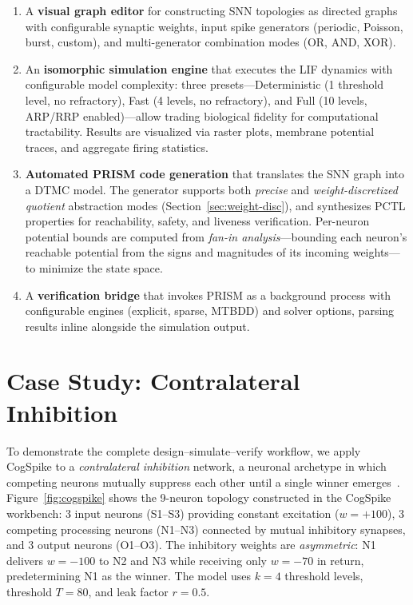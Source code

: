 \documentclass[runningheads]{llncs}
\begin{document}
\begin{enumerate}
\item A \textbf{visual graph editor} for constructing SNN topologies as directed
  graphs with configurable synaptic weights, input spike generators (periodic,
  Poisson, burst, custom), and multi-generator combination modes (OR, AND, XOR).

\item An \textbf{isomorphic simulation engine} that executes the LIF dynamics
  with configurable model complexity: three presets---Deterministic (1 threshold
  level, no refractory), Fast (4 levels, no refractory), and Full (10 levels,
  ARP/RRP enabled)---allow trading biological fidelity for computational
  tractability. Results are visualized via raster plots, membrane potential
  traces, and aggregate firing statistics.

\item \textbf{Automated PRISM code generation} that translates the SNN graph into
  a DTMC model. The generator supports both \emph{precise} and
  \emph{weight-discretized quotient} abstraction modes
  (Section~\ref{sec:weight-disc}), and synthesizes PCTL properties for
  reachability, safety, and liveness verification. Per-neuron potential bounds
  are computed from \emph{fan-in analysis}---bounding each neuron's reachable
  potential from the signs and magnitudes of its incoming weights---to minimize
  the state space.

\item A \textbf{verification bridge} that invokes PRISM as a background process
  with configurable engines (explicit, sparse, MTBDD) and solver options, parsing
  results inline alongside the simulation output.
\end{enumerate}


\section{Case Study: Contralateral Inhibition}\label{sec:casestudy}

To demonstrate the complete design--simulate--verify workflow, we apply CogSpike
to a \emph{contralateral inhibition} network, a neuronal archetype in which
competing neurons mutually suppress each other until a single winner
emerges~\cite{demaria2022formal}. Figure~\ref{fig:cogspike} shows the 9-neuron
topology constructed in the CogSpike workbench: 3 input neurons (S1--S3)
providing constant excitation ($w = +100$), 3 competing processing neurons
(N1--N3) connected by mutual inhibitory synapses, and 3 output neurons (O1--O3).
The inhibitory weights are \emph{asymmetric}: N1 delivers $w = -100$ to N2 and N3
while receiving only $w = -70$ in return, predetermining N1 as the winner. The
model uses $k = 4$ threshold levels, threshold $T = 80$, and leak factor
$r = 0.5$.
\end{document}
